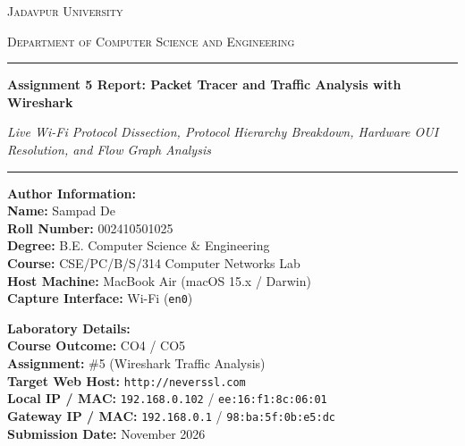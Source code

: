 \documentclass[11pt,a4paper]{article}
\begin{document}
\begin{titlepage}
    \centering
    \vspace*{0.8cm}
    
    {\large\scshape Jadavpur University \par}
    \vspace{0.3cm}
    {\normalsize\scshape Department of Computer Science and Engineering\par}
    \vspace{0.8cm}
    
    \rule{\textwidth}{1.2pt}\par
    \vspace{0.4cm}
    {\huge\bfseries Assignment 5 Report: Packet Tracer and Traffic Analysis with Wireshark \par}
    \vspace{0.3cm}
    {\Large\itshape Live Wi-Fi Protocol Dissection, Protocol Hierarchy Breakdown, Hardware OUI Resolution, and Flow Graph Analysis \par}
    \vspace{0.4cm}
    \rule{\textwidth}{1.2pt}\par
    
    \vspace{1.2cm}
    
    \begin{minipage}[t]{0.48\textwidth}
        \textbf{Author Information:}\\
        \textbf{Name:} Sampad De\\
        \textbf{Roll Number:} 002410501025\\
        \textbf{Degree:} B.E. Computer Science \& Engineering\\
        \textbf{Course:} CSE/PC/B/S/314 Computer Networks Lab\\
        \textbf{Host Machine:} MacBook Air (macOS 15.x / Darwin)\\
        \textbf{Capture Interface:} Wi-Fi (\texttt{en0})
    \end{minipage}
    \vspace{0.35cm}
    \begin{minipage}[t]{0.48\textwidth}
        \raggedleft
        \textbf{Laboratory Details:}\\
        \textbf{Course Outcome:} CO4 / CO5\\
        \textbf{Assignment:} \#5 (Wireshark Traffic Analysis)\\
        \textbf{Target Web Host:} \texttt{http://neverssl.com}\\
        \textbf{Local IP / MAC:} \texttt{192.168.0.102} / \texttt{ee:16:f1:8c:06:01}\\
        \textbf{Gateway IP / MAC:} \texttt{192.168.0.1} / \texttt{98:ba:5f:0b:e5:dc}\\
        \textbf{Submission Date:} November 2026
    \end{minipage}
    

\end{titlepage}
\end{document}
